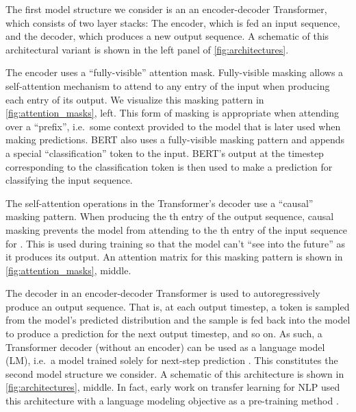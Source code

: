 \documentclass[twoside,11pt]{article}
\begin{document}
The first model structure we consider is an an encoder-decoder Transformer, which consists of two layer stacks: The encoder, which is fed an input sequence, and the decoder, which produces a new output sequence.
A schematic of this architectural variant is shown in the left panel of \cref{fig:architectures}.

The encoder uses a ``fully-visible'' attention mask.
Fully-visible masking allows a self-attention mechanism to attend to any entry of the input when producing each entry of its output.
We visualize this masking pattern in \cref{fig:attention_masks}, left.
This form of masking is appropriate when attending over a ``prefix'', i.e.\ some context provided to the model that is later used when making predictions.
BERT \citep{devlin2018bert} also uses a fully-visible masking pattern and appends a special ``classification'' token to the input.
BERT's output at the timestep corresponding to the classification token is then used to make a prediction for classifying the input sequence.

The self-attention operations in the Transformer's decoder use a ``causal'' masking pattern.
When producing the th entry of the output sequence, causal masking prevents the model from attending to the th entry of the input sequence for .
This is used during training so that the model can't ``see into the future'' as it produces its output.
An attention matrix for this masking pattern is shown in \cref{fig:attention_masks}, middle.

The decoder in an encoder-decoder Transformer is used to autoregressively produce an output sequence.
That is, at each output timestep, a token is sampled from the model's predicted distribution and the sample is fed back into the model to produce a prediction for the next output timestep, and so on.
As such, a Transformer decoder (without an encoder) can be used as a language model (LM), i.e.\ a model trained solely for next-step prediction \citep{liu2018generating,radford2018improving,al2019character}.
This constitutes the second model structure we consider.
A schematic of this architecture is shown in \cref{fig:architectures}, middle.
In fact, early work on transfer learning for NLP used this architecture with a language modeling objective as a pre-training method \citep{radford2018improving}.
\end{document}
